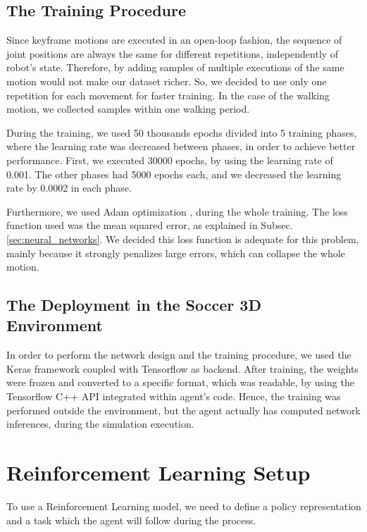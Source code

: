 \subsection{The Training Procedure}
Since keyframe motions are executed in an open-loop fashion, the sequence of joint positions are always the same for different repetitions, independently of robot's state. Therefore, by adding samples of multiple executions of the same motion would not make our dataset richer. So, we decided to use only one repetition for each movement for faster training. In the case of the walking motion, we collected samples within one walking period.

During the training, we used 50 thousands epochs divided into 5 training phases, where the learning rate was decreased between phases, in order to achieve better performance. First, we executed 30000 epochs, by using the learning rate of 0.001. The other phases had 5000 epochs each, and we decreased the learning rate by 0.0002 in each phase.

Furthermore, we used Adam optimization \cite{adam2014}, during the whole training. The loss function used was the mean squared error, as explained in Subsec. \ref{sec:neural_networks}. We decided this loss function is adequate for this problem, mainly because it strongly penalizes large errors, which can collapse the whole motion.

\subsection{The Deployment in the Soccer 3D Environment}
In order to perform the network design and the training procedure, we used the Keras \cite{chollet2015keras} framework coupled with Tensorflow \cite{tensorflow2015-whitepaper} as backend. After training, the weights were frozen and converted to a specific format, which was readable, by using the Tensorflow C++ API integrated within agent's code. Hence, the training was performed outside the environment, but the agent actually has computed network inferences, during the simulation execution.

\section{Reinforcement Learning Setup}

To use a Reinforcement Learning model, we need to define a policy representation and a task which the agent will follow during the process.

